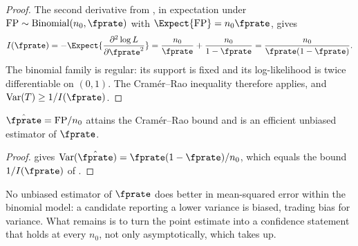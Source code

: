 \begin{proof}
The second derivative from , in expectation under
$\mathrm{FP} \sim \mathrm{Binomial}(n_0, \fprate)$ with $\Expect{\mathrm{FP}} =
n_0 \fprate$, gives
\[
  I(\fprate) = -\Expect{\frac{\partial^2 \log L}{\partial \fprate^2}}
  = \frac{n_0}{\fprate} + \frac{n_0}{1 - \fprate}
  = \frac{n_0}{\fprate(1 - \fprate)}.
\]
The binomial family is regular: its support is fixed and its
log-likelihood is twice differentiable on $(0,1)$. The Cram\'er--Rao
inequality therefore applies, and $\mathrm{Var}(T) \ge 1/I(\fprate)$.
\end{proof}

\begin{proposition}[Efficiency]
\label{prop:binomial-efficiency}
$\hat{\fprate} = \mathrm{FP}/n_0$ attains the Cram\'er--Rao bound and is an
efficient unbiased estimator of $\fprate$.
\end{proposition}

\begin{proof}
 gives $\mathrm{Var}(\hat{\fprate}) = \fprate(1 -
\fprate)/n_0$, which equals the bound $1/I(\fprate)$ of
.
\end{proof}

No unbiased estimator of $\fprate$ does better in mean-squared error within
the binomial model: a candidate reporting a lower variance is biased, trading
bias for variance. What remains is to turn the point estimate into a
confidence statement that holds at every $n_0$, not only asymptotically, which
 takes up.
